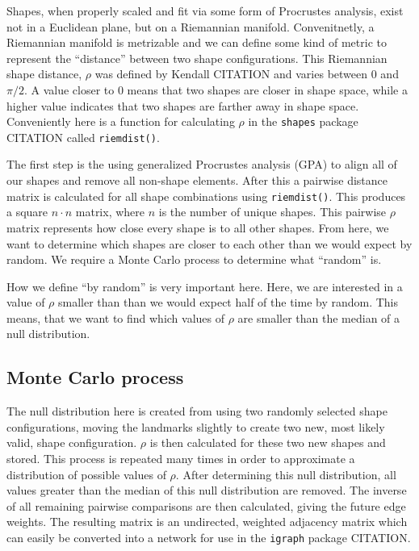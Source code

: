 \documentclass{article}\usepackage{graphicx, color}
\begin{document}
Shapes, when properly scaled and fit via some form of Procrustes analysis, exist not in a Euclidean plane, but on a Riemannian manifold.
Convenitnetly, a Riemannian manifold is metrizable and we can define some kind of metric to represent the ``distance'' between two shape configurations.
This Riemannian shape distance, \(\rho\) was defined by Kendall CITATION and varies between 0 and \(\pi /2\).
A value closer to 0 means that two shapes are closer in shape space, while a higher value indicates that two shapes are farther away in shape space.
Conveniently here is a function for calculating \(\rho\) in the {\tt{shapes}} package CITATION called {\tt{riemdist()}}.

The first step is the using generalized Procrustes analysis (GPA) to align all of our shapes and remove all non-shape elements.
After this a pairwise distance matrix is calculated for all shape combinations using {\tt{riemdist()}}. This produces a square \(n \cdot n\) matrix, where \(n\) is the number of unique shapes.
This pairwise \(\rho\) matrix represents how close every shape is to all other shapes.
From here, we want to determine which shapes are closer to each other than we would expect by random.
We require a Monte Carlo process to determine what ``random'' is.

How we define ``by random'' is very important here. Here, we are interested in a value of \(\rho\) smaller than than we would expect half of the time by random. This means, that we want to find which values of \(\rho\) are smaller than the median of a null distribution.


\subsection{Monte Carlo process}
The null distribution here is created from using two randomly selected shape configurations, moving the landmarks slightly to create two new, most likely valid, shape configuration.
\(\rho\) is then calculated for these two new shapes and stored.
This process is repeated many times in order to approximate a distribution of possible values of \(\rho\).
After determining this null distribution, all values greater than the median of this null distribution are removed.
The inverse of all remaining pairwise comparisons are then calculated, giving the future edge weights.
The resulting matrix is an undirected, weighted adjacency matrix which can easily be converted into a network for use in the {\tt{igraph}} package CITATION.
\end{document}
